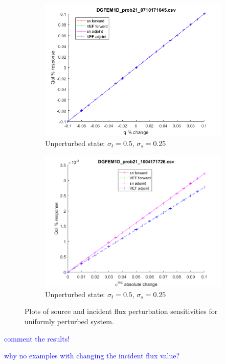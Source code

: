 \documentclass[12pt]{report}
\newcommand{\sigt}{\sigma_t}
\newcommand{\sigs}{\sigma_s}
\newcommand{\comment}[2]{\marginpar{\textcolor{#2}{$\star$}}\textcolor{#2}{#1}\newline}
\newcommand{\jcr}[1]{\comment{#1}{blue}}
\newcommand{\jcr}[1]{\phantom{a}}
\begin{document}
\begin{figure}[H]
\begin{subfigure}{.5\textwidth}
  \includegraphics[width=.98\linewidth]{figures/21qSens.png}
  \caption{Unperturbed state: $\sigt=0.5$, $\sigs=0.25$}
  \label{fig:sfig3}
\end{subfigure}%
\begin{subfigure}{.5\textwidth}
  \centering
  \includegraphics[width=.98\linewidth]{figures/21incSens.png}
  \caption{Unperturbed state: $\sigt=0.5$, $\sigs=0.25$}
  \label{fig:sfig6}
\end{subfigure}%
\caption{Plots of source and incident flux perturbation sensitivities for uniformly perturbed system.}
\label{fig:fig}
\end{figure}

\jcr{comment the results!}

\jcr{why no examples with changing the incident flux value?}
\end{document}
